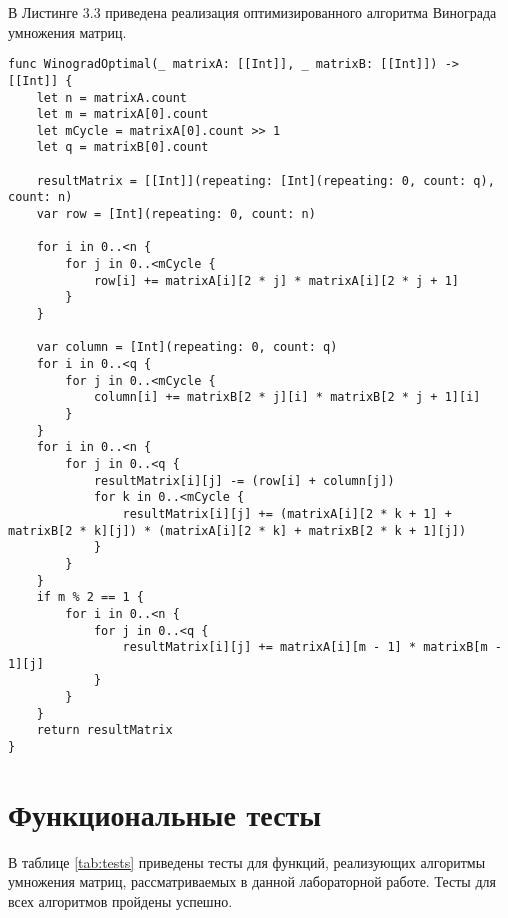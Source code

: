 В Листинге 3.3 приведена реализация оптимизированного алгоритма Винограда умножения матриц.
\begin{lstlisting}[caption=Функция оптимизированного алгоритма Винограда умножения матриц]
func WinogradOptimal(_ matrixA: [[Int]], _ matrixB: [[Int]]) -> [[Int]] {
    let n = matrixA.count
    let m = matrixA[0].count
    let mCycle = matrixA[0].count >> 1
    let q = matrixB[0].count
    
    resultMatrix = [[Int]](repeating: [Int](repeating: 0, count: q), count: n)
    var row = [Int](repeating: 0, count: n)
    
    for i in 0..<n {
        for j in 0..<mCycle {
            row[i] += matrixA[i][2 * j] * matrixA[i][2 * j + 1]
        }
    }
    
    var column = [Int](repeating: 0, count: q)
    for i in 0..<q {
        for j in 0..<mCycle {
            column[i] += matrixB[2 * j][i] * matrixB[2 * j + 1][i]
        }
    }
    for i in 0..<n {
        for j in 0..<q {
            resultMatrix[i][j] -= (row[i] + column[j])
            for k in 0..<mCycle {
                resultMatrix[i][j] += (matrixA[i][2 * k + 1] + matrixB[2 * k][j]) * (matrixA[i][2 * k] + matrixB[2 * k + 1][j])
            }
        }
    }
    if m % 2 == 1 {
        for i in 0..<n {
            for j in 0..<q {
                resultMatrix[i][j] += matrixA[i][m - 1] * matrixB[m - 1][j]
            }
        }
    }
    return resultMatrix
}
\end{lstlisting}


\section{Функциональные тесты}

В таблице \ref{tab:tests} приведены тесты для функций, реализующих алгоритмы умножения матриц, рассматриваемых в данной лабораторной работе. Тесты для всех алгоритмов пройдены успешно.

